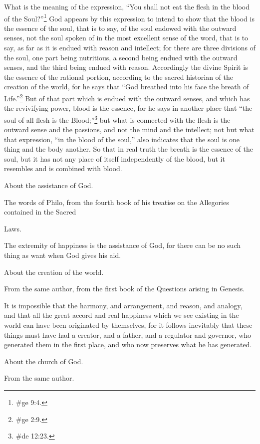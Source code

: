 What is the meaning of the expression, ``You shall not eat the flesh in the blood of the
Soul?''\footnote{\#ge 9:4.} God appears by this expression to intend to show that the blood is the
essence of the soul, that is to say, of the soul endowed with the outward senses, not the soul
spoken of in the most excellent sense of the word, that is to say, as far as it is endued with reason
and intellect; for there are three divisions of the soul, one part being nutritious, a second being
endued with the outward senses, and the third being endued with reason. Accordingly the divine
Spirit is the essence of the rational portion, according to the sacred historian of the creation of the
world, for he says that ``God breathed into his face the breath of Life.''\footnote{\#ge 2:9.} But of that part
which is endued with the outward senses, and which has the revivifying power, blood is the
essence, for he says in another place that ``the soul of all flesh is the Blood;''\footnote{\#de 12:23.}
but what is connected with the flesh is the outward sense and the passions, and not the mind and
the intellect; not but what that expression, ``in the blood of the soul,'' also indicates that the soul is
one thing and the body another. So that in real truth the breath is the essence of the soul, but it has
not any place of itself independently of the blood, but it resembles and is combined with blood.

About the assistance of God.

The words of Philo, from the fourth book of his treatise on the Allegories contained in the Sacred

Laws.

The extremity of happiness is the assistance of God, for there can be no such thing as want when
God gives his aid.

About the creation of the world.

From the same author, from the first book of the Questions arising in Genesis.

It is impossible that the harmony, and arrangement, and reason, and analogy, and that all the great
accord and real happiness which we see existing in the world can have been originated by
themselves, for it follows inevitably that these things must have had a creator, and a father, and a
regulator and governor, who generated them in the first place, and who now preserves what he has
generated.

About the church of God.

From the same author.

